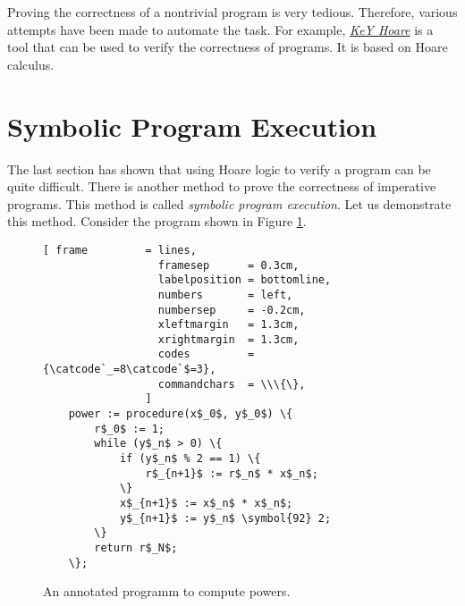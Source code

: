 \remark
Proving the correctness of a nontrivial program is very tedious.
Therefore, various attempts have been made to automate the task.  For
example, \href{http://www.key-project.org/download/hoare/}{\emph{KeY Hoare}}
is a tool that can be used to verify the correctness of programs.  It is based on
Hoare calculus.


\section{Symbolic  Program Execution}
The last section has shown that using Hoare logic to verify a program can be quite difficult.
There is another method to prove the correctness of imperative programs.  This method is called
\emph{symbolic program execution}.  Let us demonstrate this method.  Consider the program
shown in Figure \ref{fig:power-iterative-annotated.stlx}.


\begin{figure}[!h]
\centering
\begin{Verbatim}[ frame         = lines, 
                  framesep      = 0.3cm, 
                  labelposition = bottomline,
                  numbers       = left,
                  numbersep     = -0.2cm,
                  xleftmargin   = 1.3cm,
                  xrightmargin  = 1.3cm,
                  codes         = {\catcode`_=8\catcode`$=3},
                  commandchars  = \\\{\},
                ]
    power := procedure(x$_0$, y$_0$) \{
        r$_0$ := 1;
        while (y$_n$ > 0) \{
            if (y$_n$ % 2 == 1) \{
                r$_{n+1}$ := r$_n$ * x$_n$;
            \} 
            x$_{n+1}$ := x$_n$ * x$_n$;
            y$_{n+1}$ := y$_n$ \symbol{92} 2;            
        \} 
        return r$_N$;
    \};
\end{Verbatim}
\vspace*{-0.3cm}
\caption{An annotated programm to compute powers.}
\label{fig:power-iterative-annotated.stlx}
\end{figure} %

